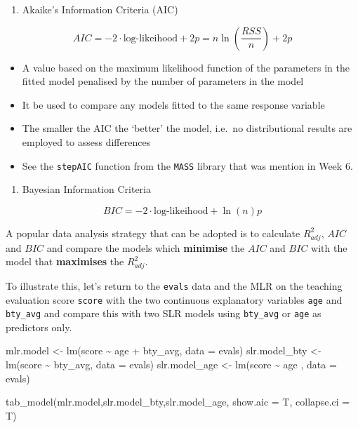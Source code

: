 \documentclass[
  letterpaper,
  DIV=11,
  numbers=noendperiod]{scrartcl}
\newenvironment{Shaded}{\begin{snugshade}}{\end{snugshade}}
\newcommand{\AttributeTok}[1]{\textcolor[rgb]{0.40,0.45,0.13}{#1}}
\newcommand{\FunctionTok}[1]{\textcolor[rgb]{0.28,0.35,0.67}{#1}}
\newcommand{\NormalTok}[1]{\textcolor[rgb]{0.00,0.23,0.31}{#1}}
\newcommand{\OtherTok}[1]{\textcolor[rgb]{0.00,0.23,0.31}{#1}}
\newcommand{\SpecialCharTok}[1]{\textcolor[rgb]{0.37,0.37,0.37}{#1}}
\providecommand{\tightlist}{%
  \setlength{\itemsep}{0pt}\setlength{\parskip}{0pt}}\usepackage{longtable,booktabs,array}
\begin{document}
\begin{enumerate}
\def\labelenumi{\arabic{enumi}.}
\setcounter{enumi}{1}
\tightlist
\item
  Akaike's Information Criteria (AIC)
\end{enumerate}

\[AIC = -2 \cdot \text{log-likeihood} + 2p = n\ln\left(\frac{RSS}{n}\right)+2p\]

\begin{itemize}
\tightlist
\item
  A value based on the maximum likelihood function of the parameters in
  the fitted model penalised by the number of parameters in the model
\item
  It be used to compare any models fitted to the same response variable
\item
  The smaller the AIC the `better' the model, i.e.~no distributional
  results are employed to assess differences
\item
  See the \texttt{stepAIC} function from the \texttt{MASS} library that
  was mention in Week 6.
\end{itemize}

\begin{enumerate}
\def\labelenumi{\arabic{enumi}.}
\setcounter{enumi}{2}
\tightlist
\item
  Bayesian Information Criteria
\end{enumerate}

\[BIC = -2 \cdot \text{log-likeihood} +\ln(n)p\]

A popular data analysis strategy that can be adopted is to calculate
\(R_{adj}^2\), \(AIC\) and \(BIC\) and compare the models which
\textbf{minimise} the \(AIC\) and \(BIC\) with the model that
\textbf{maximises} the \(R_{adj}^2\).

To illustrate this, let's return to the \texttt{evals} data and the MLR
on the teaching evaluation score \texttt{score} with the two continuous
explanatory variables \texttt{age} and \texttt{bty\_avg} and compare
this with two SLR models using \texttt{bty\_avg} or \texttt{age} as
predictors only.

\begin{Shaded}
\begin{Highlighting}[]
\NormalTok{mlr.model }\OtherTok{\textless{}{-}} \FunctionTok{lm}\NormalTok{(score }\SpecialCharTok{\textasciitilde{}}\NormalTok{ age }\SpecialCharTok{+}\NormalTok{ bty\_avg, }\AttributeTok{data =}\NormalTok{ evals) }
\NormalTok{slr.model\_bty }\OtherTok{\textless{}{-}} \FunctionTok{lm}\NormalTok{(score }\SpecialCharTok{\textasciitilde{}}\NormalTok{ bty\_avg, }\AttributeTok{data =}\NormalTok{ evals) }
\NormalTok{slr.model\_age }\OtherTok{\textless{}{-}} \FunctionTok{lm}\NormalTok{(score }\SpecialCharTok{\textasciitilde{}}\NormalTok{ age , }\AttributeTok{data =}\NormalTok{ evals) }

\FunctionTok{tab\_model}\NormalTok{(mlr.model,slr.model\_bty,slr.model\_age,}
          \AttributeTok{show.aic =}\NormalTok{ T,}
          \AttributeTok{collapse.ci =}\NormalTok{ T)}
\end{Highlighting}
\end{Shaded}
\end{document}
